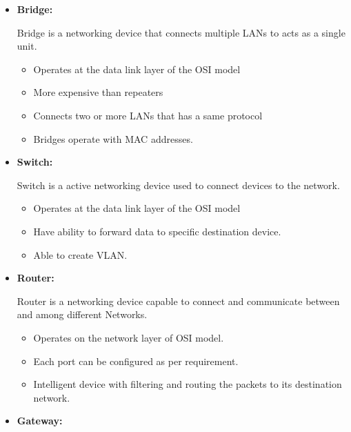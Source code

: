 \documentclass[a4paper,11pt]{article}
\begin{document}
\begin{A}
{\begin{itemize}
            \item {\Large \textbf{ Bridge:}}

                  Bridge is a networking device that connects multiple LANs to acts as a single unit.
                  \begin{itemize}
                      \item Operates at the data link layer of the OSI model
                      \item More expensive than repeaters
                      \item Connects two or more LANs that has a same protocol
                      \item Bridges operate with MAC addresses.

                  \end{itemize}

            \item {\Large \textbf{ Switch:}}

                  Switch is a active networking device used to connect devices to the network.
                  \begin{itemize}
                      \item Operates at the data link layer of the OSI model
                      \item Have ability to forward data to specific destination device.
                      \item Able to create VLAN.
                  \end{itemize}

            \item {\Large \textbf{ Router:}}

                  Router is a networking device capable to connect and communicate between and among different Networks.
                  \begin{itemize}
                      \item Operates on the network layer of OSI model.
                      \item Each port can be configured as per requirement.
                      \item Intelligent device with filtering and routing the packets to its destination network.

                  \end{itemize}

            \item {\Large \textbf{ Gateway:}}


\end{itemize}}
\end{A}
\end{document}
